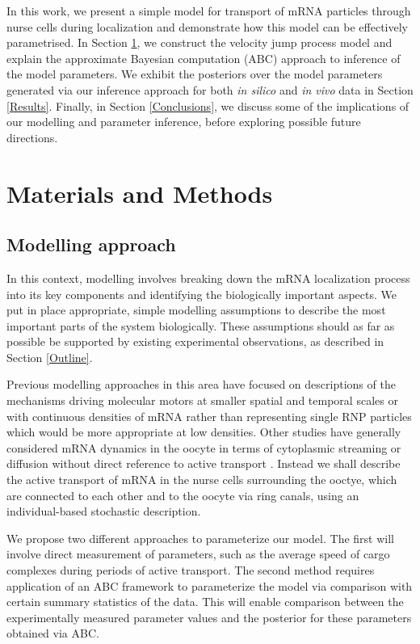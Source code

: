 \documentclass[twocolumn]{biophys}
\begin{document}
In this work, we present a simple model for transport of mRNA particles through nurse cells during localization and demonstrate how this model can be effectively parametrised.
In Section \ref{Methods}, we construct the velocity jump process model and explain the approximate Bayesian computation (ABC) approach to inference of the model parameters.
We exhibit the posteriors over the model parameters generated via our inference approach for both \textit{in silico} and \textit{in vivo} data in Section \ref{Results}.
Finally, in Section \ref{Conclusions}, we discuss some of the implications of our modelling and parameter inference, before exploring possible future directions.

\section{Materials and Methods} \label{Methods}
\subsection{Modelling approach} \label{Modelling}
In this context, modelling involves breaking down the mRNA localization process into its key components and identifying the biologically important aspects. 
We put in place appropriate, simple modelling assumptions to describe the most important parts of the system biologically.
These assumptions should as far as possible be supported by existing experimental observations, as described in Section \ref{Outline}.

Previous modelling approaches in this area have focused on descriptions of the mechanisms driving molecular motors at smaller spatial and temporal scales \citep{bressloff2013stochastic} or with continuous densities of mRNA \citep{szymanska2014mathematical} rather than representing single RNP particles which would be more appropriate at low densities.
Other studies have generally considered mRNA dynamics in the oocyte in terms of cytoplasmic streaming or diffusion without direct reference to active transport \citep{ganguly2012cytoplasmic, liu2011role}.
Instead we shall describe the active transport of mRNA in the nurse cells surrounding the ooctye, which are connected to each other and to the oocyte via ring canals, using an individual-based stochastic description.

We propose two different approaches to parameterize our model. 
The first will involve direct measurement of parameters, such as the average speed of cargo complexes during periods of active transport.
The second method requires application of an ABC framework \citep{johnston2014interpreting, turner2012tutorial, beaumont2002approximate} to parameterize the model via comparison with certain summary statistics of the data.
This will enable comparison between the experimentally measured parameter values and the posterior for these parameters obtained via ABC.
\end{document}
